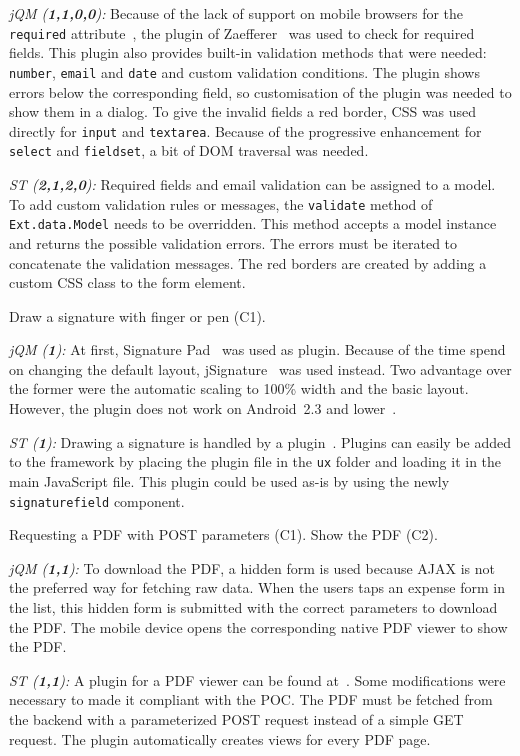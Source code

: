 \documentclass[a4paper]{artikel3}
\newcommand{\code}[1]{\texttt{#1}}
\newcommand{\setspace}[0]{\vspace{2mm}}
\renewcommand{\paragraph}[1]{\setspace \noindent {\bf #1}  }
\newcommand{\framework}[2]{ \emph{#1 (\textbf{#2}): }} %
\newcommand{\challenge}[1]{\paragraph{#1}}
\begin{document}
\framework{jQM}{1,1,0,0}
Because of the lack of support on mobile browsers for the \code{required} attribute~\cite{Deveria2013}, the plugin of Zaefferer~\cite{Zaefferer2013} was used to check for required fields.
This plugin also provides built-in validation methods that were needed: \code{number}, \code{email} and \code{date} and custom validation conditions.
The plugin shows errors below the corresponding field, so customisation of the plugin was needed to show them in a dialog.
To give the invalid fields a red border, CSS was used directly for \code{input} and \code{textarea}.
Because of the progressive enhancement for \code{select} and \code{fieldset}, a bit of DOM traversal was needed.

\framework{ST}{2,1,2,0}
Required fields and email validation can be assigned to a model.  
To add custom validation rules or messages,  the \code{validate} method of \code{Ext.data.Model} needs to be overridden.  
This method accepts a model instance and returns the possible validation errors.  
The errors must be iterated to concatenate the validation messages.
The red borders are created by adding a custom CSS class to the form element.

\challenge{Signature (C1)}
Draw a signature with finger or pen (C1).

\framework{jQM}{1}
At first, Signature Pad~\cite{Bradley2013} was used as plugin.
Because of the time spend on changing the default layout, jSignature~\cite{Systems2013} was used instead.
Two advantage over the former were the automatic scaling to 100\% width and the basic layout.
However, the plugin does not work on Android~2.3 and lower~\cite{Systems2013}.

\framework{ST}{1}
Drawing a signature is handled by a plugin~\cite{SimFla2011}.  
Plugins can easily be added to the framework by placing the plugin file in the \code{ux} folder and loading it in the main JavaScript file.  
This plugin could be used as-is by using the newly \code{signaturefield} component.  

\challenge{Show PDF (C1,C2)}
Requesting a PDF with POST parameters (C1).
Show the PDF (C2).

\framework{jQM}{1,1}
To download the PDF, a hidden form is used because AJAX is not the preferred way for fetching raw data.
When the users taps an expense form in the list, this hidden form is submitted with the correct parameters to download the PDF.
The mobile device opens the corresponding native PDF viewer to show the PDF.

\framework{ST}{1,1}
A plugin for a PDF viewer can be found at~\cite{Fiedler2012}.  
Some modifications were necessary to made it compliant with the POC.  
The PDF must be fetched from the backend with a parameterized POST request instead of a simple GET request.  
The plugin automatically creates views for every PDF page.  
\end{document}
